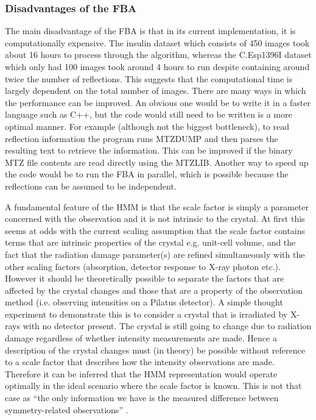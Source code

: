 \subsubsection{Disadvantages of the FBA}
\label{subs:Disadvantages of the FBA}
The main disadvantage of the FBA is that in its current implementation, it is computationally expensive.
The insulin dataset which consists of 450 images took about 16 hours to process through the algorithm, whereas the C.Esp1396I dataset which only had 100 images took around 4 hours to run despite containing around twice the number of reflections.
This suggests that the computational time is largely dependent on the total number of images.
There are many ways in which the performance can be improved.
An obvious one would be to write it in a faster language such as C++, but the code would still need to be written is a more optimal manner.
For example (although not the biggest bottleneck), to read reflection information the program runs MTZDUMP and then parses the resulting text to retrieve the information.
This can be improved if the binary MTZ file contents are read directly using the MTZLIB.
Another way to speed up the code would be to run the FBA in parallel, which is possible because the reflections can be assumed to be independent.

A fundamental feature of the HMM is that the scale factor is simply a parameter concerned with the observation and it is not intrinsic to the crystal.
At first this seems at odds with the current scaling assumption that the scale factor contains terms that are intrinsic properties of the crystal e.g. unit-cell volume, and the fact that the radiation damage parameter(s) are refined simultaneously with the other scaling factors (absorption, detector response to X-ray photon etc.).
However it should be theoretically possible to separate the factors that are affected by the crystal changes and those that are a property of the observation method (i.e. observing intensities on a Pilatus detector).
A simple thought experiment to demonstrate this is to consider a crystal that is irradiated by X-rays with no detector present.
The crystal is still going to change due to radiation damage regardless of whether intensity measurements are made.
Hence a description of the crystal changes must (in theory) be possible without reference to a scale factor that describes how the intensity observations are made.
Therefore it can be inferred that the HMM representation would operate optimally in the ideal scenario where the scale factor is known.
This is not that case as ``the only information we have is the measured difference between symmetry-related observations'' \cite{evans2005}.

